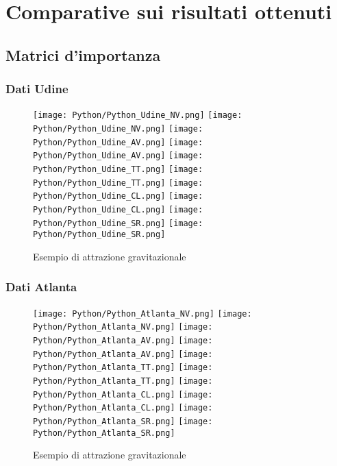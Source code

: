 \chapter{Comparative sui risultati ottenuti}

\section{Matrici d'importanza}
\subsection{Dati Udine}
\begin{figure}
    \begin{center}
    \texttt{[image: Python/Python\_Udine\_NV.png]}
    \texttt{[image: Python/Python\_Udine\_NV.png]}
    \texttt{[image: Python/Python\_Udine\_AV.png]}
    \texttt{[image: Python/Python\_Udine\_AV.png]}
    \texttt{[image: Python/Python\_Udine\_TT.png]}
    \texttt{[image: Python/Python\_Udine\_TT.png]}
    \texttt{[image: Python/Python\_Udine\_CL.png]}
    \texttt{[image: Python/Python\_Udine\_CL.png]}
    \texttt{[image: Python/Python\_Udine\_SR.png]}
    \texttt{[image: Python/Python\_Udine\_SR.png]}
    \caption[Arda 1]{Esempio di attrazione gravitazionale}
    \label{etichetta}
    \end{center}
\end{figure}
\subsection{Dati Atlanta}
\begin{figure}
    \begin{center}
    \texttt{[image: Python/Python\_Atlanta\_NV.png]}
    \texttt{[image: Python/Python\_Atlanta\_NV.png]}
    \texttt{[image: Python/Python\_Atlanta\_AV.png]}
    \texttt{[image: Python/Python\_Atlanta\_AV.png]}
    \texttt{[image: Python/Python\_Atlanta\_TT.png]}
    \texttt{[image: Python/Python\_Atlanta\_TT.png]}
    \texttt{[image: Python/Python\_Atlanta\_CL.png]}
    \texttt{[image: Python/Python\_Atlanta\_CL.png]}
    \texttt{[image: Python/Python\_Atlanta\_SR.png]}
    \texttt{[image: Python/Python\_Atlanta\_SR.png]}
    \caption[Arda 1]{Esempio di attrazione gravitazionale}
    \label{etichetta}
    \end{center}
\end{figure}


